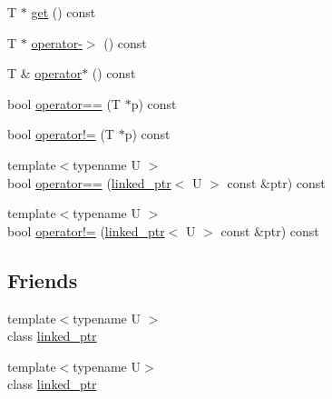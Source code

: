 \begin{DoxyCompactItemize}
T $\ast$ \hyperlink{classtesting_1_1internal_1_1linked__ptr_a6ea8584d9bcad13c3266834f5ce5e771}{get} () const 
\item 
T $\ast$ \hyperlink{classtesting_1_1internal_1_1linked__ptr_aa878c3e874242fb3cd2aa14ec603aa25}{operator-\/$>$} () const 
\item 
T \& \hyperlink{classtesting_1_1internal_1_1linked__ptr_aec393cbd60f96defde36ef8a69d94254}{operator$\ast$} () const 
\item 
bool \hyperlink{classtesting_1_1internal_1_1linked__ptr_abe2154fd3ad3574dfe6f2320bc1debc4}{operator==} (T $\ast$p) const 
\item 
bool \hyperlink{classtesting_1_1internal_1_1linked__ptr_a3685f9661bbe410cfa58fea2f14396b7}{operator!=} (T $\ast$p) const 
\item 
{\footnotesize template$<$typename U $>$ }\\bool \hyperlink{classtesting_1_1internal_1_1linked__ptr_a3b46c9ecfd928673a524dcb3c70fd2ad}{operator==} (\hyperlink{classtesting_1_1internal_1_1linked__ptr}{linked\-\_\-ptr}$<$ U $>$ const \&ptr) const 
\item 
{\footnotesize template$<$typename U $>$ }\\bool \hyperlink{classtesting_1_1internal_1_1linked__ptr_a6449584b90a09a313300599fb3a23633}{operator!=} (\hyperlink{classtesting_1_1internal_1_1linked__ptr}{linked\-\_\-ptr}$<$ U $>$ const \&ptr) const 
\end{DoxyCompactItemize}
\subsection*{Friends}
\begin{DoxyCompactItemize}
\item 
{\footnotesize template$<$typename U $>$ }\\class \hyperlink{classtesting_1_1internal_1_1linked__ptr_a7763f286ca03a7f7363a033d996c8c1c}{linked\-\_\-ptr}
\item 
{\footnotesize template$<$typename U$>$ }\\class \hyperlink{classtesting_1_1internal_1_1linked__ptr_ad958455805aabe94647642ee4fa7c0e6}{linked\-\_\-ptr}
\end{DoxyCompactItemize}


